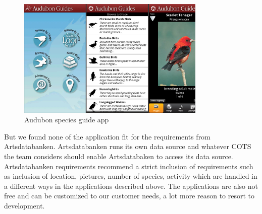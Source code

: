 \begin{figure}[htb]
    \centering
    \includegraphics[width=0.8\textwidth]{introduction/project_description/audubonguide.png}
    \caption{Audubon species guide app}
    \label{fig:audubonapp}
\end{figure}

But we found none of the application fit for the requirements from Artsdatabanken. Artsdatabanken runs its own data source and whatever COTS the team considers should enable Artsdatabaken to access its data source. Artsdatabanken requirements recommend a strict inclusion of requirements such as inclusion of location, pictures, number of species, activity which are handled in a different ways in the applications described above. The applications are also not free and  can be customized to our customer needs, a lot more reason to resort to development.

